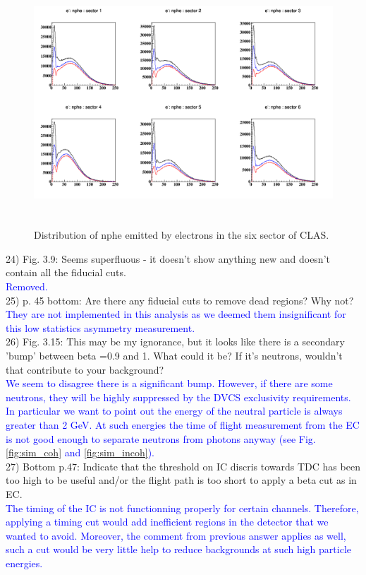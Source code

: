 \begin{figure}[tbp]
\centering
\includegraphics[height=9.2cm]{fig/nphe_1_sectors.png}
\caption{Distribution of nphe emitted by electrons in the six sector of CLAS.}
\label{fig:nphe_1}
\end{figure}

24) Fig. 3.9: Seems superfluous - it doesn't show anything new and doesn't 
contain all the fiducial cuts.\\
 \textcolor{blue}{Removed.}\\

25) p. 45 bottom: Are there any fiducial cuts to remove dead regions? Why 
not?\\
\textcolor{blue}{They are not implemented in this analysis as we deemed them
insignificant for this low statistics asymmetry measurement.}\\

26) Fig. 3.15: This may be my ignorance, but it looks like there is a 
secondary 'bump' between beta =0.9 and 1. What could it be? If it's neutrons, 
wouldn't that contribute to your background?\\
\textcolor{blue}{We seem to disagree there is a significant bump. However, if 
   there are some neutrons, they will be highly suppressed by the DVCS
   exclusivity requirements. In particular we want to point out the energy of the 
   neutral particle is always greater than 2 GeV. At such energies the time 
   of flight measurement from the EC is not good enough to separate neutrons 
   from photons anyway (see Fig. \ref{fig:sim_coh} and \ref{fig:sim_incoh}).}\\

27) Bottom p.47: Indicate that the threshold on IC discris towards TDC has been 
too high to be useful and/or the flight path is too short to apply a beta cut 
as in EC.\\
\textcolor{blue}{
 The timing of the IC is not functionning properly for certain channels. Therefore, 
 applying a timing cut would add inefficient regions in the detector that we 
 wanted to avoid. Moreover, the comment from previous answer applies as well,
such a cut would be very little help to reduce backgrounds at such high particle energies.}\\

